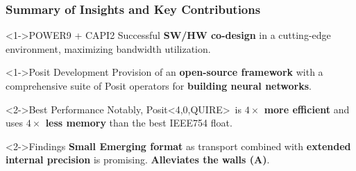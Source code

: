 \begin{frame}
    \frametitle{Summary of Insights and Key Contributions}

    \begin{alertblock}<1->{POWER9 + CAPI2}
	    Successful \textbf{SW/HW co-design} in a cutting-edge environment, maximizing bandwidth utilization.
    \end{alertblock}
	    \vspace{-2mm}

    \begin{alertblock}<1->{Posit Development}
	    Provision of an \textbf{open-source framework} with a comprehensive suite of Posit operators for \textbf{building neural networks}.
    \end{alertblock}
	    \vspace{-2mm}
    \begin{block}<2->{Best Performance}
	    Notably, Posit\textless4,0,QUIRE\textgreater\ is \textbf{$4\times$ more efficient} and uses \textbf{$4\times$ less memory} than the best IEEE754 float.
    \end{block}

	    \vspace{-2mm}

    \begin{exampleblock}<2->{Findings}
	    \textbf{Small Emerging format} as transport combined with \textbf{extended internal precision} is promising. \textbf{Alleviates the walls (A)}.
    \end{exampleblock}
\end{frame}

